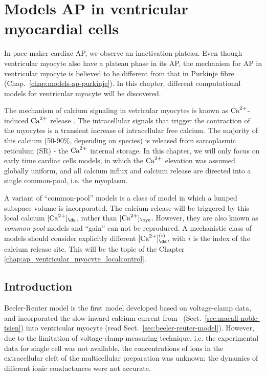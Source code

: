 

\chapter{Models AP in ventricular myocardial cells}
\label{chap:ap_ventricular_myocyte}

In pace-maker cardiac AP, we observe an inactivation plateau. Even
though ventricular myocyte also have a plateau phase in its AP, the
mechanism for AP in ventricular myocyte is believed to be different
from that in Purkinje fibre (Chap.~\ref{chap:models-ap-purkinje}).  In
this chapter, different computational models for ventricular myocyte
will be discovered.

The mechanism of calcium signaling in vetricular myocytes is known as
${\text{Ca}^{2+}}$-induced ${\text{Ca}^{2+}}$ release \citep{fabiato1975cic,fabiato1979cir}.
The intracellular signals that trigger the contraction of the myocytes is a
transient increase of intracellular free calcium. The majority of this calcium
(50-90\%, depending on species) is released from sarcoplasmic reticulum (SR) -
the ${\text{Ca}^{2+}} $ internal storage. In this chapter, we will only focus on early time
cardiac cells models, in which the ${\text{Ca}^{2+}} $ elevation was assumed globally
uniform, and all calcium influx and calcium release are directed into a single
common-pool, i.e. the myoplasm. 

A variant of ``common-pool'' models is a class of model in which a lumped
subspace volume is incorporated. The calcium release will be triggered by this
local calcium $[\Ca]_\ds$, rather than $[\Ca]_\myo$.
However, they are also known as {\it common-pool} models and ``gain'' can not be
reproduced. A mechanistic class of models should consider explicitly different
$[\Ca]_\ds^{(i)}$, with $i$ is the index of the calcium release site. This will
be the topic of the Chapter \ref{chap:ap_ventricular_myocyte_localcontrol}.

\section{Introduction}

Beeler-Reuter model is the first model developed based on voltage-clamp data,
and incorporated the slow-inward calcium current from~\citep{mcallister1975rea}
(Sect.~\ref{sec:macall-noble-tsien}) into ventricular myocyte (read
Sect.~\ref{sec:beeler-reuter-model}). However, due to the limitation of
voltage-clamp measuring technique, i.e. the experimental data for single cell
was not available, the concentrations of ions in the extracellular cleft of the
multicellular preparation was unknown; the dynamics of different ionic
conductances were not accurate.


